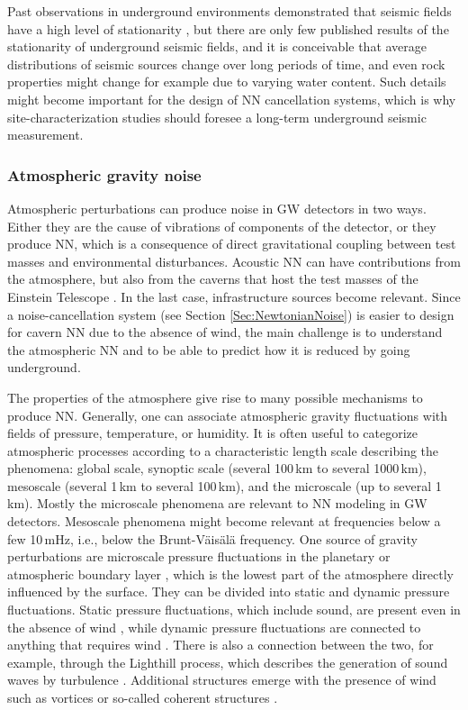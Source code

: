 Past observations in underground environments demonstrated that seismic fields have a high level of stationarity \cite{CoEA2014,BaEA2017}, but there are only few published results of the stationarity of underground seismic fields, and it is conceivable that average distributions of seismic sources change over long periods of time, and even rock properties might change for example due to varying water content. Such details might become important for the design of NN cancellation systems, which is why site-characterization studies should foresee a long-term underground seismic measurement.

\subsubsection*{Atmospheric gravity noise}
Atmospheric perturbations can produce noise in GW detectors in two ways. Either they are the cause of vibrations of components of the detector, or they produce NN, which is a consequence of direct gravitational coupling between test masses and environmental disturbances. Acoustic NN can have contributions from the atmosphere, but also from the caverns that host the test masses of the Einstein Telescope \cite{FiEA2018, Har2015}. In the last case, infrastructure sources become relevant. Since a noise-cancellation system (see Section \ref{Sec:NewtonianNoise}) is easier to design for cavern NN due to the absence of wind, the main challenge is to understand the atmospheric NN and to be able to predict how it is reduced by going underground.

The properties of the atmosphere give rise to many possible mechanisms to produce NN. Generally, one can associate atmospheric gravity fluctuations with fields of pressure, temperature, or humidity. It is often useful to categorize atmospheric processes according to a characteristic length scale describing the phenomena: global scale, synoptic scale (several 100\,km to several 1000\,km), mesoscale (several 1\,km to several 100\,km), and the microscale (up to several 1\,km). Mostly the microscale phenomena are relevant to NN modeling in GW detectors. Mesoscale phenomena might become relevant at frequencies below a few 10\,mHz, i.e., below the Brunt-V\"ais\"al\"a frequency. One source of gravity perturbations are microscale pressure fluctuations in the planetary or atmospheric boundary layer \cite{Ell1972a,McHe1975}, which is the lowest part of the atmosphere directly influenced by the surface. They can be divided into static and dynamic pressure fluctuations. Static pressure fluctuations, which include sound, are present even in the absence of wind \cite{AlEA1998}, while dynamic pressure fluctuations are connected to anything that requires wind \cite{BMS2004,ScJe2018}. There is also a connection between the two, for example, through the Lighthill process, which describes the generation of sound waves by turbulence \cite{Lig1952,Lig1954}. Additional structures emerge with the presence of wind such as vortices or so-called coherent structures \cite{TrEA2015}. 

